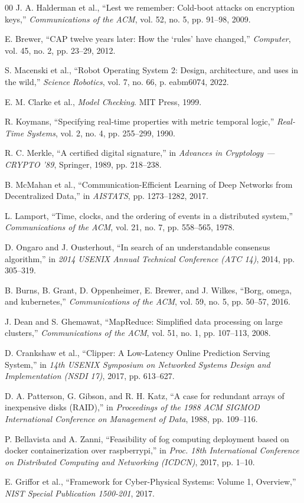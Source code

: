 \documentclass[conference]{IEEEtran}
\begin{document}
\begin{thebibliography}{00}
 J. A. Halderman et al., ``Lest we remember: Cold-boot attacks on encryption keys,'' \textit{Communications of the ACM}, vol. 52, no. 5, pp. 91--98, 2009.

 E. Brewer, ``CAP twelve years later: How the `rules' have changed,'' \textit{Computer}, vol. 45, no. 2, pp. 23--29, 2012.

 S. Macenski et al., ``Robot Operating System 2: Design, architecture, and uses in the wild,'' \textit{Science Robotics}, vol. 7, no. 66, p. eabm6074, 2022.

 E. M. Clarke et al., \textit{Model Checking}. MIT Press, 1999.

 R. Koymans, ``Specifying real-time properties with metric temporal logic,'' \textit{Real-Time Systems}, vol. 2, no. 4, pp. 255--299, 1990.

 R. C. Merkle, ``A certified digital signature,'' in \textit{Advances in Cryptology --- CRYPTO '89}, Springer, 1989, pp. 218--238.

 B. McMahan et al., ``Communication-Efficient Learning of Deep Networks from Decentralized Data,'' in \textit{AISTATS}, pp. 1273--1282, 2017.

 L. Lamport, ``Time, clocks, and the ordering of events in a distributed system,'' \textit{Communications of the ACM}, vol. 21, no. 7, pp. 558--565, 1978.

 D. Ongaro and J. Ousterhout, ``In search of an understandable consensus algorithm,'' in \textit{2014 USENIX Annual Technical Conference (ATC 14)}, 2014, pp. 305--319.

 B. Burns, B. Grant, D. Oppenheimer, E. Brewer, and J. Wilkes, ``Borg, omega, and kubernetes,'' \textit{Communications of the ACM}, vol. 59, no. 5, pp. 50--57, 2016.

 J. Dean and S. Ghemawat, ``MapReduce: Simplified data processing on large clusters,'' \textit{Communications of the ACM}, vol. 51, no. 1, pp. 107--113, 2008.

 D. Crankshaw et al., ``Clipper: A Low-Latency Online Prediction Serving System,'' in \textit{14th USENIX Symposium on Networked Systems Design and Implementation (NSDI 17)}, 2017, pp. 613--627.

 D. A. Patterson, G. Gibson, and R. H. Katz, ``A case for redundant arrays of inexpensive disks (RAID),'' in \textit{Proceedings of the 1988 ACM SIGMOD International Conference on Management of Data}, 1988, pp. 109--116.

 P. Bellavista and A. Zanni, ``Feasibility of fog computing deployment based on docker containerization over raspberrypi,'' in \textit{Proc. 18th International Conference on Distributed Computing and Networking (ICDCN)}, 2017, pp. 1--10.

 E. Griffor et al., ``Framework for Cyber-Physical Systems: Volume 1, Overview,'' \textit{NIST Special Publication 1500-201}, 2017.

\end{thebibliography}
\end{document}
